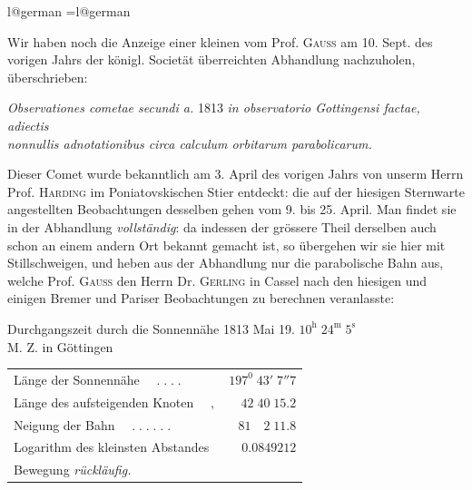 \clearpage
\begingroup
\pagestyle{empty}
\ifcsname l@german\endcsname
  \language=\csname l@german\endcsname\relax
   
\fi
{}
\vspace*{.045\textheight}
\noindent{}\par\bigskip
Wir haben noch die Anzeige einer kleinen vom Prof. \textsc{Gauss} am 10. Sept.
des vorigen Jahrs der königl. Societät überreichten Abhandlung nachzuholen,
überschrieben:
\begin{center}
\fontsize{10}{12}\selectfont
\textit{Observationes cometae secundi a.} 1813 \textit{in observatorio Gottingensi factae, adiectis}\\
\textit{nonnullis adnotationibus circa calculum orbitarum parabolicarum.}
\end{center}
Dieser Comet wurde bekanntlich am 3. April des vorigen Jahrs von unserm
Herrn Prof. \textsc{Harding} im Poniatovskischen Stier entdeckt: die auf der hiesigen
Sternwarte angestellten Beobachtungen desselben gehen vom 9. bis 25. April.
Man findet sie in der Abhandlung \textit{vollständig}: da indessen der grössere Theil derselben
auch schon an einem andern Ort bekannt gemacht ist, so übergehen wir
sie hier mit Stillschweigen, und heben aus der Abhandlung nur die parabolische
Bahn aus, welche Prof. \textsc{Gauss} den Herrn Dr. \textsc{Gerling} in Cassel nach den hiesigen
und einigen Bremer und Pariser Beobachtungen zu berechnen veranlasste:
\begin{center}\small
Durchgangszeit durch die Sonnennähe 1813 Mai 19. $10^{\mathrm h}\;24^{\mathrm m}\;5^{\mathrm s}$\\
M. Z. in Göttingen
\end{center}
\begin{center}\small
\begin{tabular}{@{}l@{\qquad}r@{}}
Länge der Sonnennähe $\quad.\;.\;.\;.$ & $197^0\;43'\;7''7$\\
Länge des aufsteigenden Knoten $\quad,$ & $42\;40\;15.2$\\
Neigung der Bahn $\quad.\;.\;.\;.\;.\;.$ & $81\quad2\;11.8$\\
Logarithm des kleinsten Abstandes & $0.0849212$\\
\multicolumn{2}{l}{Bewegung \textit{rückläufig.}}
\end{tabular}\end{center}

